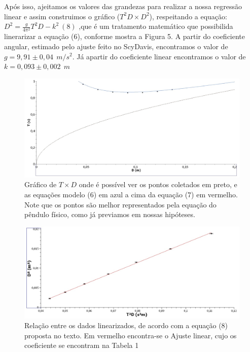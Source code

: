 \documentclass[hidelinks,a4paper,10pt]{article}
\begin{document}
\qquad Após isso, ajeitamos os valores das grandezas para realizar 
a nossa regressão linear e assim construimos o gráfico ($T^2D \times D^2$), respeitando a 
equação: $D^2 = \frac{g}{4\pi^2}T^2D - k^2 \ (8) $ ,que é um tratamento matemático que possibilida linerarizar a equação (6), conforme mostra a Figura 5.
 A partir do coeficiente angular, estimado pelo ajuste feito no ScyDavis, encontramos o valor de $\boxed{g = 9,91 \pm 0,04 \ \ m/s^2}$. Já apartir do coeficiente linear encontramos o valor de $\boxed{k = 0,093 \pm 0,002 \ \ m }$ 
\pagebreak
\begin{figure}[h]
    \centering
    \includegraphics[width=0.7\linewidth]{grafico5.png}
    \caption{\small{Gráfico de $T \times D $ onde é possível ver os pontos coletados em preto, e as equações modelo (6) em azul a cima da equação (7) em vermelho. 
    Note que os pontos são melhor representados pela equação do pêndulo físico, como já previamos em nossas hipóteses. }}
    \label{fig:1.4}
\end{figure}
\begin{figure}[h]
    \centering
    \includegraphics[width=0.7\linewidth]{grafico4.png}
    \caption{\small{Relação entre os dados linearizados, de acordo com a equação (8) proposta no texto. Em vermelho encontra-se o Ajuste linear, cujo os coeficiente se encontram na Tabela 1
    }}
    \label{fig:1.4}
\end{figure}
\end{document}
